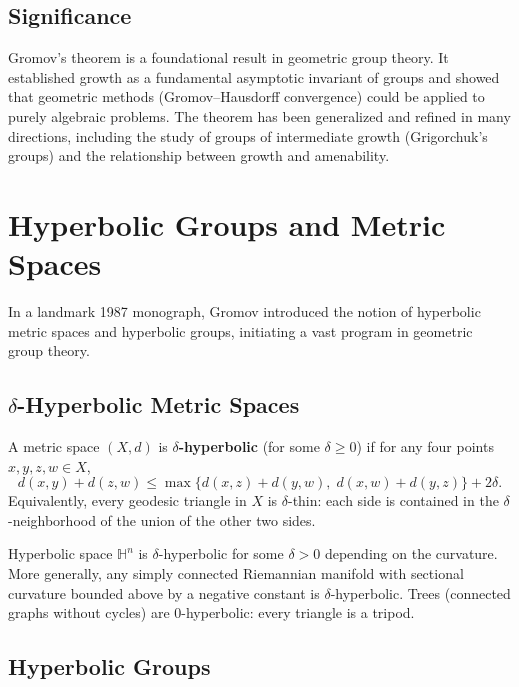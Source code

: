 \subsection{Significance}

Gromov's theorem is a foundational result in geometric group theory. It established growth as a fundamental asymptotic invariant of groups and showed that geometric methods (Gromov--Hausdorff convergence) could be applied to purely algebraic problems. The theorem has been generalized and refined in many directions, including the study of groups of intermediate growth (Grigorchuk's groups) and the relationship between growth and amenability.

\section{Hyperbolic Groups and Metric Spaces}

In a landmark 1987 monograph, Gromov introduced the notion of hyperbolic metric spaces and hyperbolic groups, initiating a vast program in geometric group theory.

\subsection{\texorpdfstring{\(\delta\)}{delta}-Hyperbolic Metric Spaces}

\begin{definition}
A metric space \((X, d)\) is \textbf{\(\delta\)-hyperbolic} (for some \(\delta \geq 0\)) if for any four points \(x, y, z, w \in X\),
\[
d(x, y) + d(z, w) \leq \max\{d(x, z) + d(y, w),\; d(x, w) + d(y, z)\} + 2\delta.
\]
Equivalently, every geodesic triangle in \(X\) is \(\delta\)-thin: each side is contained in the \(\delta\)-neighborhood of the union of the other two sides.
\end{definition}

\begin{example}
Hyperbolic space \(\mathbb{H}^n\) is \(\delta\)-hyperbolic for some \(\delta > 0\) depending on the curvature. More generally, any simply connected Riemannian manifold with sectional curvature bounded above by a negative constant is \(\delta\)-hyperbolic. Trees (connected graphs without cycles) are 0-hyperbolic: every triangle is a tripod.
\end{example}

\subsection{Hyperbolic Groups}

